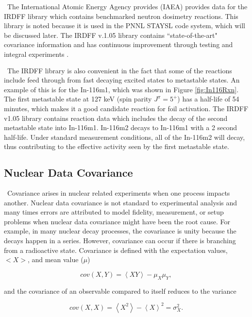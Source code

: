 \ The International Atomic Energy Agency provides (IAEA) provides data for the IRDFF library which contains benchmarked neutron dosimetry reactions\cite{IRDFF}. This library is noted because it is used in the PNNL STAYSL code system, which will be discussed later. The IRDFF v.1.05 library contains ``state-of-the-art" covariance information and has continuous improvement through testing and integral experiments \cite{Greenwood2017}. 

\ The IRDFF library is also convenient in the fact that some of the reactions include feed through from fast decaying excited states to metastable states. An example of this is for the In-116m1, which was shown in Figure \ref{fig:In116Rxn}. The first metastable state at 127 keV (spin parity $J^{\pi} = 5^{+}$) has a half-life of 54 minutes, which makes it a good candidate reaction for foil activation\cite{Zolotarev2013}. The IRDFF v1.05 library contains reaction data which includes the decay of the second metastable state into In-116m1. In-116m2 decays to In-116m1 with a 2 second half-life. Under standard measurement conditions, all of the In-116m2 will decay, thus contributing to the effective activity seen by the first metastable state. 

\subsection{Nuclear Data Covariance}

\ Covariance arises in nuclear related experiments when one process impacts another. 
Nuclear data covariance is not standard to experimental analysis and many times errors are attributed to model fidelity, measurement, or setup problems when nuclear data covariance might have been the root cause. %
For example, in many nuclear decay processes, the covariance is unity because the decays happen in a series. 
However, covariance can occur if there is branching from a radioactive state. 
Covariance is defined with the expectation values, $<X>$, and mean value ($\mu$)
 
\begin{equation} \label{eq:Cov1}
      cov(X,Y) = \left\langle  XY \right\rangle-\mu_{X}\mu_{Y}, 
\end{equation}

\noindent and the covariance of an observable compared to itself reduces to the variance 

\begin{equation} \label{eq:Cov2}
      cov(X,X) = \left\langle  X^{2} \right\rangle-\left\langle  X \right\rangle^{2} = \sigma_{X}^{2}.
\end{equation}

